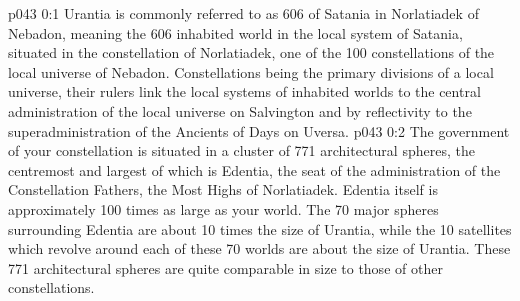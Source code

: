 \author{Malavatia Melchizedek}
\vs p043 0:1 Urantia is commonly referred to as 606 of Satania in Norlatiadek of Nebadon, meaning the 606 inhabited world in the local system of Satania, situated in the constellation of Norlatiadek, one of the 100 constellations of the local universe of Nebadon. Constellations being the primary divisions of a local universe, their rulers link the local systems of inhabited worlds to the central administration of the local universe on Salvington and by reflectivity to the superadministration of the Ancients of Days on Uversa.
\vs p043 0:2 \pc The government of your constellation is situated in a cluster of 771 architectural spheres, the centremost and largest of which is Edentia, the seat of the administration of the Constellation Fathers, the Most Highs of Norlatiadek. Edentia itself is approximately 100 times as large as your world. The 70 major spheres surrounding Edentia are about 10 times the size of Urantia, while the 10 satellites which revolve around each of these 70 worlds are about the size of Urantia. These 771 architectural spheres are quite comparable in size to those of other constellations.
